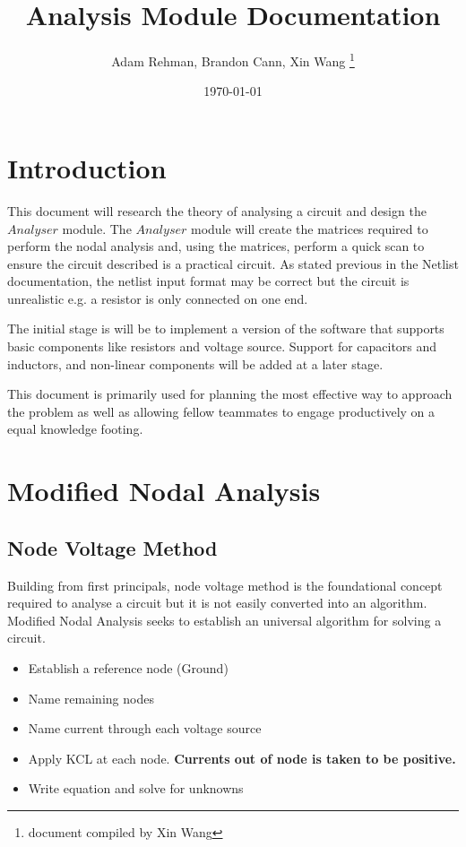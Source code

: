 \documentclass[a4paper, titlepage]{article}
\title{Analysis Module Documentation}
\author{Adam Rehman, Brandon Cann, Xin Wang \thanks{document compiled by Xin Wang}}
\date{ \today}
\begin{document}
    \maketitle
    \tableofcontents
    \pagebreak
    \section{Introduction}
    \par
    This document will research the theory of analysing a circuit and design the $Analyser$ module.
    The $Analyser$ module will create the matrices required to perform the nodal analysis and, using the 
    matrices, perform a quick scan to ensure the circuit described is a practical circuit. As stated previous
    in the Netlist documentation, the netlist input format may be correct but the circuit is unrealistic 
    e.g. a resistor is only connected on one end.
    \par
    The initial stage is will be to implement a version of the software that supports basic components
    like resistors and voltage source. Support for capacitors and inductors, and non-linear components 
    will be added at a later stage.
    \par
    This document is primarily used for planning the most effective way to approach the problem
    as well as allowing fellow teammates to engage productively on a equal knowledge footing. 
    
    \pagebreak
    \section{Modified Nodal Analysis}
    \subsection{Node Voltage Method}
    Building from first principals, node voltage method is the foundational concept required 
    to analyse a circuit but it is not easily converted into an algorithm. Modified Nodal Analysis seeks
    to establish an universal algorithm for solving a circuit.
    
    \begin{itemize}
        \item Establish a reference node (Ground)
        \item Name remaining nodes
        \item Name current through each voltage source
        \item Apply KCL at each node. \textbf{Currents out of node is taken to be positive.}
        \item Write equation and solve for unknowns
    \end{itemize}
\end{document}
